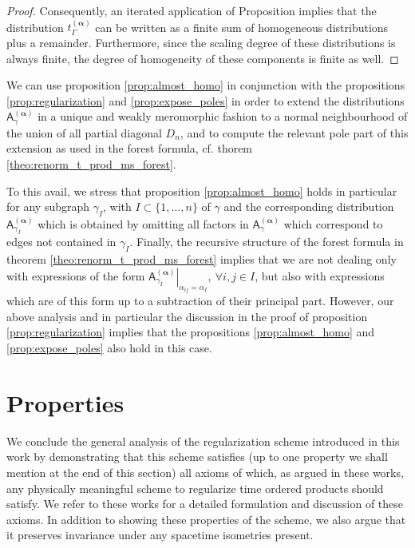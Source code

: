 \documentclass[11pt]{book}
\newcommand{\alphabd}{\boldsymbol{\alpha}}
\newcommand{\Asf}{\mathsf{A}}
\theoremstyle{break}
\begin{document}
\begin{proof}
Consequently, an iterated application of Proposition %
implies that the distribution $t_\Gamma^{(\alphabd)}$ can be written as a finite sum of homogeneous distributions plus a remainder. Furthermore, since the scaling degree of these distributions is always finite, the degree of homogeneity of these components is finite as well. 







\end{proof}


We can use proposition \ref{prop:almost_homo} in conjunction with the propositions \ref{prop:regularization} and \ref{prop:expose_poles} in order to extend the distributions $\Asf_\gamma^{(\alphabd)}$ in a unique and weakly meromorphic fashion to a normal neighbourhood of the union of all partial diagonal $D_n$, and to compute the relevant pole part of this extension as used in the forest formula, cf. thorem \ref{theo:renorm_t_prod_ms_forest}. 


To this avail, we stress that proposition \ref{prop:almost_homo} holds in particular for any subgraph $\gamma_I$, with $I\subset\{1,\dots,n\}$ of $\gamma$ and the corresponding distribution $\Asf_{\gamma_I}^{(\alphabd)}$ which is obtained by omitting all factors in $\Asf_{\gamma}^{(\alphabd)}$ which correspond to edges not contained in $\gamma_I$. Finally, the recursive structure of the forest formula in theorem \ref{theo:renorm_t_prod_ms_forest} implies that we are not dealing only with 
expressions of the form $\left.\Asf_{\gamma_I}^{(\alphabd)}\right|_{\alpha_{ij}=\alpha_I}, \  \forall i,j\in I$, but also with expressions which are of this form up to a subtraction of their principal part. However, our above analysis and in particular the discussion in the proof of proposition \ref{prop:regularization} implies that the propositions \ref{prop:almost_homo} and \ref{prop:expose_poles} also hold in this case.


\section{Properties}


We conclude the general analysis of the regularization scheme introduced in this work by demonstrating that this scheme satisfies (up to one property we shall mention at the end of this section) all axioms of \cite{hollands_local_2001,hollands_existence_2002,hollands_conservation_2005} which, as argued in these works, any physically meaningful scheme to regularize time ordered products should satisfy. We refer to these works for a detailed formulation and discussion of these axioms. In addition to showing these properties of the scheme, we also argue that it preserves invariance under any spacetime isometries present.
\end{document}
